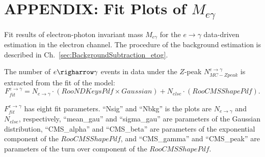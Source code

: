 \chapter{APPENDIX: Fit Plots of $M_{e\gamma}$}
\label{sec:EtogammaFitPlots}

Fit results of electron-photon invariant mass $M_{e\gamma}$ for the $e \rightarrow \gamma$ data-driven estimation in the electron channel. The procedure of the background estimation is described in Ch.~\ref{sec:BackgroundSubtraction_etog}.

The number of $e\righarrow\gamma$ events in data under the $Z$-peak $N_{MC-Zpeak}^{e\rightarrow\gamma}$ is extracted from the fit of the model: 
\begin{equation}
F_{fit}^{e\rightarrow\gamma} = N_{e\rightarrow\gamma} \cdot (RooNDKeysPdf \times Gaussian) +  N_{else} \cdot (RooCMSShapePdf).
\end{equation}

$F_{fit}^{e\rightarrow\gamma}$ has eight fit parameters. ``Nsig'' and ``Nbkg'' is the plots are $N_{e\rightarrow\gamma}$ and $N_{else}$, respectively, ``mean\_gau'' and ``sigma\_gau'' are parameters of the Gaussian distribution, ``CMS\_alpha'' and ``CMS\_beta'' are parameters of the exponential component of the $RooCMSShapePdf$, and ``CMS\_gamma'' and ``CMS\_peak'' are parameters of the turn over component of the $RooCMSShapePdf$.  

